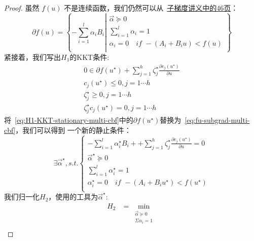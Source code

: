 \begin{proof}
虽然 $f(u)$ 不是连续函数，我们仍然可以从~\href{https://people.orie.cornell.edu/mru8/orie6326/lectures/subgradient.pdf}{子梯度讲义中的46页}：
\begin{equation} \label{eq:fu-subgrad-multi-cbf}
\partial f\left( u \right) =\left\{ -\sum_{i=1}^l{\alpha _iB_i}\left| \begin{array}{c}
	\overrightarrow{\alpha }\succeq 0\\
	\sum_{i=1}^l{\alpha _i}=1\\
    \alpha _i=0 \quad if\,\,-\left( A_i+B_iu \right) <f\left( u \right) \\
\end{array} \right. \right\}
\end{equation}
紧接着，我们写出$H_1$的KKT条件:
\begin{eqnarray}
	0\in \partial f\left( u^{\star} \right) +\sum_{j=1}^h{\zeta _{j}^{\star}\frac{\partial c_j\left( u^{\star} \right)}{\partial u}} \label{eq:H1-KKT-stationary-multi-cbf} \\
	c_j\left( u^{\star} \right) \le 0, j=1\cdots h\\
	\zeta _{j}^{\star}\ge 0, j=1\cdots h\\
	\zeta _{j}^{\star}c_j\left( u^{\star} \right) =0, j=1\cdots h \label{eq:H1-KKT-complementary-multi-cbf}
\end{eqnarray}
将~\eqref{eq:H1-KKT-stationary-multi-cbf}中的$\partial f(u^{\star})$替换为~\eqref{eq:fu-subgrad-multi-cbf}，我们可以得到 一个新的静止条件：
\begin{equation}
\exists \overrightarrow{\alpha }^{\star}, s.t. \begin{cases}
	-\sum_{i=1}^l{\alpha _{i}^{\star}B_i}++\sum_{j=1}^h{\zeta _{j}^{\star}\frac{\partial c_j\left( u^{\star} \right)}{\partial u}}=0\\
	\overrightarrow{\alpha }^{\star}\succeq 0\\
	\sum_{i=1}^l{\alpha _{i}^{\star}}=1\\
	\alpha _{i}^{\star}=0 \quad if\,\,-\left( A_i+B_iu^{\star} \right) <f\left( u^{\star} \right)\\
\end{cases}
\end{equation}
我们归一化$H_2$，使用的工具为$\overrightarrow{\alpha}^{\star}$:
\begin{equation}
\begin{aligned}
	H_2&=\min_{\begin{array}{c}
	\overrightarrow{\alpha }\succeq 0\\
	\Sigma \alpha _i=1\\

\end{array}}
\end{aligned}
\end{equation}
\end{proof}
